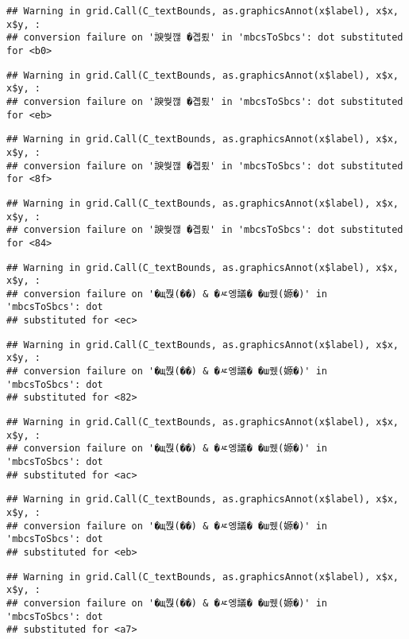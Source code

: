 \documentclass[
]{article}
\begin{document}
\begin{verbatim}
## Warning in grid.Call(C_textBounds, as.graphicsAnnot(x$label), x$x, x$y, :
## conversion failure on '諛쒖깮 �곕룄' in 'mbcsToSbcs': dot substituted for <b0>
\end{verbatim}

\begin{verbatim}
## Warning in grid.Call(C_textBounds, as.graphicsAnnot(x$label), x$x, x$y, :
## conversion failure on '諛쒖깮 �곕룄' in 'mbcsToSbcs': dot substituted for <eb>
\end{verbatim}

\begin{verbatim}
## Warning in grid.Call(C_textBounds, as.graphicsAnnot(x$label), x$x, x$y, :
## conversion failure on '諛쒖깮 �곕룄' in 'mbcsToSbcs': dot substituted for <8f>
\end{verbatim}

\begin{verbatim}
## Warning in grid.Call(C_textBounds, as.graphicsAnnot(x$label), x$x, x$y, :
## conversion failure on '諛쒖깮 �곕룄' in 'mbcsToSbcs': dot substituted for <84>
\end{verbatim}

\begin{verbatim}
## Warning in grid.Call(C_textBounds, as.graphicsAnnot(x$label), x$x, x$y, :
## conversion failure on '�щ쭩(��) & �ㅼ엥議� �ш퀬(嫄�)' in 'mbcsToSbcs': dot
## substituted for <ec>
\end{verbatim}

\begin{verbatim}
## Warning in grid.Call(C_textBounds, as.graphicsAnnot(x$label), x$x, x$y, :
## conversion failure on '�щ쭩(��) & �ㅼ엥議� �ш퀬(嫄�)' in 'mbcsToSbcs': dot
## substituted for <82>
\end{verbatim}

\begin{verbatim}
## Warning in grid.Call(C_textBounds, as.graphicsAnnot(x$label), x$x, x$y, :
## conversion failure on '�щ쭩(��) & �ㅼ엥議� �ш퀬(嫄�)' in 'mbcsToSbcs': dot
## substituted for <ac>
\end{verbatim}

\begin{verbatim}
## Warning in grid.Call(C_textBounds, as.graphicsAnnot(x$label), x$x, x$y, :
## conversion failure on '�щ쭩(��) & �ㅼ엥議� �ш퀬(嫄�)' in 'mbcsToSbcs': dot
## substituted for <eb>
\end{verbatim}

\begin{verbatim}
## Warning in grid.Call(C_textBounds, as.graphicsAnnot(x$label), x$x, x$y, :
## conversion failure on '�щ쭩(��) & �ㅼ엥議� �ш퀬(嫄�)' in 'mbcsToSbcs': dot
## substituted for <a7>
\end{verbatim}
\end{document}

